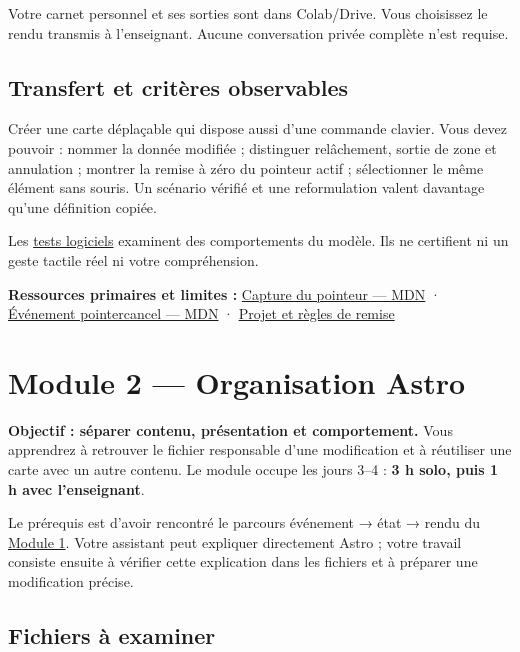 \documentclass[
  canadien,
  11pt,
  a4paper,
]{report}
\begin{document}
Votre carnet personnel et ses sorties sont dans Colab/Drive. Vous
choisissez le rendu transmis à l'enseignant. Aucune conversation privée
complète n'est requise.

\section{Transfert et critères
observables}\label{transfert-et-crituxe8res-observables}

Créer une carte déplaçable qui dispose aussi d'une commande clavier.
Vous devez pouvoir : nommer la donnée modifiée ; distinguer relâchement,
sortie de zone et annulation ; montrer la remise à zéro du pointeur
actif ; sélectionner le même élément sans souris. Un scénario vérifié et
une reformulation valent davantage qu'une définition copiée.

Les \href{../../../../../tests/learning-notebooks-bricks.test.ts}{tests
logiciels} examinent des comportements du modèle. Ils ne certifient ni
un geste tactile réel ni votre compréhension.

\textbf{Ressources primaires et limites :}
\href{https://developer.mozilla.org/en-US/docs/Web/API/Element/setPointerCapture}{Capture
du pointeur --- MDN} ·
\href{https://developer.mozilla.org/en-US/docs/Web/API/Element/pointercancel_event}{Événement
pointercancel --- MDN} · \href{../../PROJECT.md}{Projet et règles de
remise}

\chapter{Module 2 --- Organisation
Astro}\label{module-2-organisation-astro}

\textbf{Objectif : séparer contenu, présentation et comportement.} Vous
apprendrez à retrouver le fichier responsable d'une modification et à
réutiliser une carte avec un autre contenu. Le module occupe les jours
3--4 : \textbf{3 h solo, puis 1 h avec l'enseignant}.

Le prérequis est d'avoir rencontré le parcours événement → état → rendu
du \href{../../modules/module-1.md}{Module 1}. Votre assistant peut
expliquer directement Astro ; votre travail consiste ensuite à vérifier
cette explication dans les fichiers et à préparer une modification
précise.

\section{Fichiers à examiner}\label{fichiers-uxe0-examiner}
\end{document}
